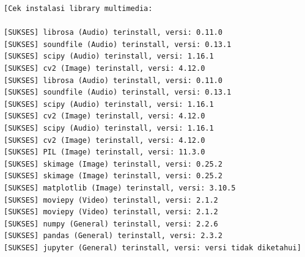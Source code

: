 \documentclass[11pt,a4paper]{article}
\begin{document}
\begin{lstlisting}[caption=Output verifikasi instalasi]
[Cek instalasi library multimedia:

[SUKSES] librosa (Audio) terinstall, versi: 0.11.0
[SUKSES] soundfile (Audio) terinstall, versi: 0.13.1
[SUKSES] scipy (Audio) terinstall, versi: 1.16.1
[SUKSES] cv2 (Image) terinstall, versi: 4.12.0
[SUKSES] librosa (Audio) terinstall, versi: 0.11.0
[SUKSES] soundfile (Audio) terinstall, versi: 0.13.1
[SUKSES] scipy (Audio) terinstall, versi: 1.16.1
[SUKSES] cv2 (Image) terinstall, versi: 4.12.0
[SUKSES] scipy (Audio) terinstall, versi: 1.16.1
[SUKSES] cv2 (Image) terinstall, versi: 4.12.0
[SUKSES] PIL (Image) terinstall, versi: 11.3.0
[SUKSES] skimage (Image) terinstall, versi: 0.25.2
[SUKSES] skimage (Image) terinstall, versi: 0.25.2
[SUKSES] matplotlib (Image) terinstall, versi: 3.10.5
[SUKSES] moviepy (Video) terinstall, versi: 2.1.2
[SUKSES] moviepy (Video) terinstall, versi: 2.1.2
[SUKSES] numpy (General) terinstall, versi: 2.2.6
[SUKSES] pandas (General) terinstall, versi: 2.3.2
[SUKSES] jupyter (General) terinstall, versi: versi tidak diketahui]
\end{lstlisting}
\end{document}
